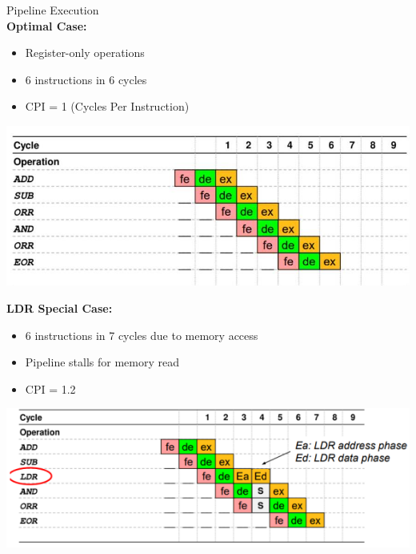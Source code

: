 \begin{concept}{Pipeline Execution}\\
\textbf{Optimal Case:}
\begin{itemize}
  \item Register-only operations
  \item 6 instructions in 6 cycles
  \item CPI = 1 (Cycles Per Instruction)
\end{itemize}

\includegraphics[width=\linewidth]{images/2024_12_29_79e6b22f503fb7b4f718g-14}

\textbf{LDR Special Case:}
\begin{itemize}
  \item 6 instructions in 7 cycles due to memory access
  \item Pipeline stalls for memory read
  \item CPI = 1.2
\end{itemize}

\includegraphics[width=\linewidth]{images/ldrpipelinespecialcase.png}
\end{concept}

